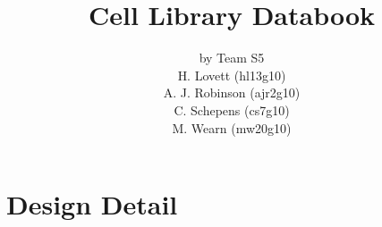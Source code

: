 \documentclass{desex3}         %
\newcommand{\cellname}[1] {\clearpage \section{#1} \makebox[\linewidth]{\rule{\textwidth}{0.4pt}}}
\begin{document}
\title{Cell Library Databook}

\author{by Team S5\\ H. Lovett (hl13g10) \\ A. J. Robinson (ajr2g10) \\ C. Schepens (cs7g10) \\ M. Wearn (mw20g10)}
\maketitle
\cleardoublepage
\tableofcontents













%

%


%
%
%
%




\appendix


\clearpage
\section{Design Detail}
\renewcommand{\cellname}[1] {\newpage \subsection{#1} \makebox[\linewidth]{\rule{\textwidth}{0.4pt}}}
\newcommand{\stickdiagram}[1]{\subsubsection*{Stick Diagram} \texttt{[image: \#1]}}
\newcommand{\transistor}[1]{\subsubsection*{Transistor Level Circuit Diagram} \texttt{[image: \#1]}}
\newcommand{\spicesim}[1]{\subsubsection*{HSpice Simulation} \texttt{[image: \#1]}}








\end{document}
